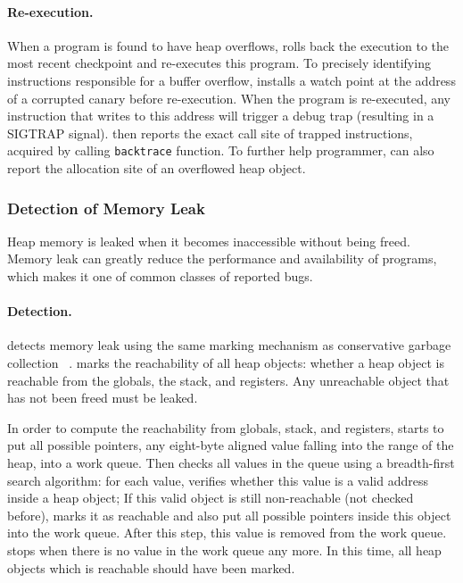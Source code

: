 \paragraph{Re-execution.}
\label{sec:overflowreport}
When a program is found to have heap overflows, \doubletake{} rolls back the execution to the most recent checkpoint and re-executes this program.
To precisely identifying instructions responsible for a buffer overflow, \doubletake{} installs a watch point at the address of a corrupted canary before re-execution. When the program is re-executed, any instruction that writes to this address will trigger a debug trap (resulting in a SIGTRAP signal). \doubletake{} then reports the exact call site of trapped instructions, acquired by calling \texttt{backtrace} function. To further help programmer, \doubletake{} can also report the allocation site of an overflowed heap object. 
  
\subsubsection{Detection of Memory Leak}
\label{sec:leak}
Heap memory is leaked when it becomes inaccessible without being freed. Memory leak can greatly reduce the performance and availability of programs, which makes it one of common classes of reported bugs.

\paragraph{Detection.}
\doubletake{} detects memory leak using the same marking mechanism as conservative garbage collection ~\cite{Wilson:1992:UGC:645648.664824}. \doubletake{} marks the reachability of all heap objects: whether a heap object is reachable from the globals, the stack, and registers. Any unreachable object that has not been freed must be leaked. 

In order to compute the reachability from globals, stack, and registers, \doubletake{} starts to put all possible pointers, any eight-byte aligned value falling into the range of the heap, into a work queue. Then \doubletake{} checks all values in the queue using a breadth-first search algorithm: for each value, \doubletake{} verifies whether this value is a valid address inside a heap object; If this valid object is still non-reachable (not checked before), \doubletake{} marks it as reachable and also put all possible pointers inside this object into the work queue. After this step, this value is removed from the work queue. \doubletake{} stops when there is no value in the work queue any more. In this time, all heap objects which is reachable should have been marked. 

